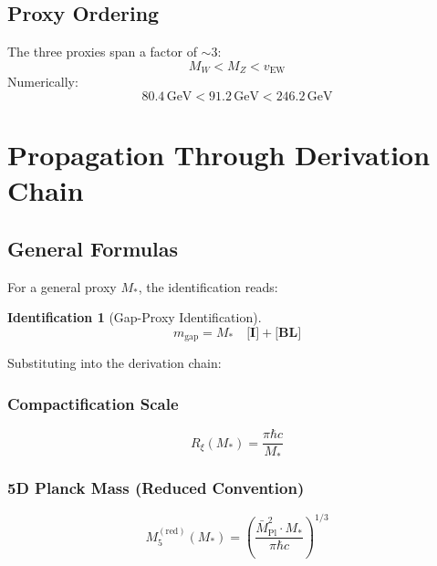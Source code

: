 \documentclass[11pt,a4paper]{article}
\newcommand{\Mpl}{\bar{M}_{\mathrm{Pl}}}
\newcommand{\Mfive}{M_5}
\newcommand{\Rxi}{R_\xi}
\newcommand{\mgap}{m_{\mathrm{gap}}}
\newcommand{\MZ}{M_Z}
\newcommand{\MW}{M_W}
\newcommand{\vEW}{v_{\mathrm{EW}}}
\newcommand{\Mstar}{M_*}
\newcommand{\GeV}{\,\mathrm{GeV}}
\newcommand{\tagI}{\textbf{[I]}}
\newcommand{\tagBL}{\textbf{[BL]}}
\theoremstyle{definition}
\newtheorem{identification}{Identification}[section]
\theoremstyle{plain}
\theoremstyle{remark}
\begin{document}
\subsection{Proxy Ordering}

The three proxies span a factor of $\sim 3$:
\begin{equation}
\MW < \MZ < \vEW
\label{eq:proxy-ordering}
\end{equation}
Numerically:
\begin{equation}
80.4\GeV < 91.2\GeV < 246.2\GeV
\label{eq:proxy-values}
\end{equation}

\section{Propagation Through Derivation Chain}
\label{sec:propagation}

\subsection{General Formulas}

For a general proxy $\Mstar$, the identification reads:
\begin{identification}[Gap-Proxy Identification]
\begin{equation}
\mgap = \Mstar \quad \tagI{}+\tagBL{}
\label{eq:gap-proxy-id}
\end{equation}
\end{identification}

Substituting into the derivation chain:

\subsubsection{Compactification Scale}
\begin{equation}
\boxed{\Rxi(\Mstar) = \frac{\pi\hbar c}{\Mstar}}
\label{eq:Rxi-of-Mstar}
\end{equation}

\subsubsection{5D Planck Mass (Reduced Convention)}
\begin{equation}
\boxed{\Mfive^{\mathrm{(red)}}(\Mstar) = \left(\frac{\Mpl^2 \cdot \Mstar}{\pi\hbar c}\right)^{1/3}}
\label{eq:M5-red-of-Mstar}
\end{equation}
\end{document}
